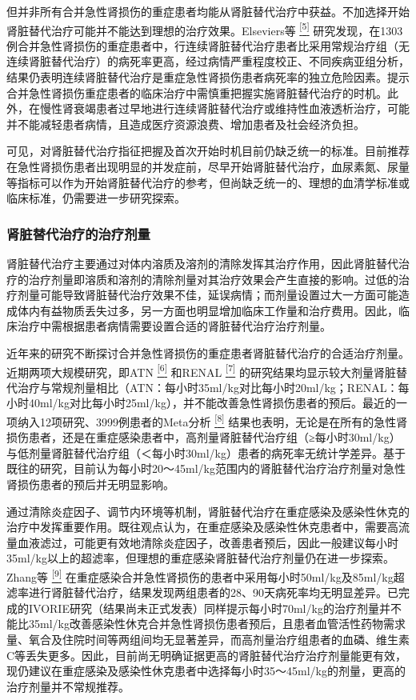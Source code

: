 但并非所有合并急性肾损伤的重症患者均能从肾脏替代治疗中获益。不加选择开始肾脏替代治疗可能并不能达到理想的治疗效果。Elseviers等
\protect\hyperlink{text00018.htmlux5cux23ch5-17}{\textsuperscript{{[}5{]}}}
研究发现，在1303例合并急性肾损伤的重症患者中，行连续肾脏替代治疗患者比采用常规治疗组（无连续肾脏替代治疗）的病死率更高，经过病情严重程度校正、不同疾病亚组分析，结果仍表明连续肾脏替代治疗是重症急性肾损伤患者病死率的独立危险因素。提示合并急性肾损伤重症患者的临床治疗中需慎重把握实施肾脏替代治疗的时机。此外，在慢性肾衰竭患者过早地进行连续肾脏替代治疗或维持性血液透析治疗，可能并不能减轻患者病情，且造成医疗资源浪费、增加患者及社会经济负担。

可见，对肾脏替代治疗指征把握及首次开始时机目前仍缺乏统一的标准。目前推荐在急性肾损伤患者出现明显的并发症前，尽早开始肾脏替代治疗，血尿素氮、尿量等指标可以作为开始肾脏替代治疗的参考，但尚缺乏统一的、理想的血清学标准或临床标准，仍需要进一步研究探索。

\subsubsection{肾脏替代治疗的治疗剂量}

肾脏替代治疗主要通过对体内溶质及溶剂的清除发挥其治疗作用，因此肾脏替代治疗的治疗剂量即溶质和溶剂的清除剂量对其治疗效果会产生直接的影响。过低的治疗剂量可能导致肾脏替代治疗效果不佳，延误病情；而剂量设置过大一方面可能造成体内有益物质丢失过多，另一方面也明显增加临床工作量和治疗费用。因此，临床治疗中需根据患者病情需要设置合适的肾脏替代治疗治疗剂量。

近年来的研究不断探讨合并急性肾损伤的重症患者肾脏替代治疗的合适治疗剂量。近期两项大规模研究，即ATN
\protect\hyperlink{text00018.htmlux5cux23ch6-17}{\textsuperscript{{[}6{]}}}
和RENAL
\protect\hyperlink{text00018.htmlux5cux23ch7-17}{\textsuperscript{{[}7{]}}}
的研究结果均显示较大剂量肾脏替代治疗与常规剂量相比（ATN：每小时35ml/kg对比每小时20ml/kg；RENAL：每小时40ml/kg对比每小时25ml/kg），并不能改善急性肾损伤患者的预后。最近的一项纳入12项研究、3999例患者的Meta分析
\protect\hyperlink{text00018.htmlux5cux23ch8-17}{\textsuperscript{{[}8{]}}}
结果也表明，无论是在所有的急性肾损伤患者，还是在重症感染患者中，高剂量肾脏替代治疗组（≥每小时30ml/kg）与低剂量肾脏替代治疗组（＜每小时30ml/kg）患者的病死率无统计学差异。基于既往的研究，目前认为每小时20～45ml/kg范围内的肾脏替代治疗治疗剂量对急性肾损伤患者的预后并无明显影响。

通过清除炎症因子、调节内环境等机制，肾脏替代治疗在重症感染及感染性休克的治疗中发挥重要作用。既往观点认为，在重症感染及感染性休克患者中，需要高流量血液滤过，可能更有效地清除炎症因子，改善患者预后，因此一般建议每小时35ml/kg以上的超滤率，但理想的重症感染肾脏替代治疗剂量仍在进一步探索。Zhang等
\protect\hyperlink{text00018.htmlux5cux23ch9-17}{\textsuperscript{{[}9{]}}}
在重症感染合并急性肾损伤的患者中采用每小时50ml/kg及85ml/kg超滤率进行肾脏替代治疗，结果发现两组患者的28、90天病死率均无明显差异。已完成的IVORIE研究（结果尚未正式发表）同样提示每小时70ml/kg的治疗剂量并不能比35ml/kg改善感染性休克合并急性肾损伤患者预后，且患者血管活性药物需求量、氧合及住院时间等两组间均无显著差异，而高剂量治疗组患者的血磷、维生素C等丢失更多。因此，目前尚无明确证据更高的肾脏替代治疗治疗剂量能更有效，现仍建议在重症感染及感染性休克患者中选择每小时35～45ml/kg的剂量，更高的治疗剂量并不常规推荐。

